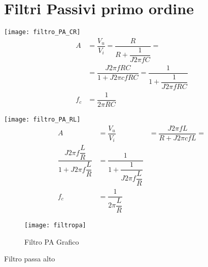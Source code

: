 \chapter{Filtri Passivi primo ordine}
\label{cha:Filtripassiviprimoord}
\minitoc
\mtcskip                                %
\minilof                                %
\mtcskip                                %
\minilot
\begin{table}
\centering
     \begin{minipage}{0.4\textwidth}
      \centering
       \texttt{[image: filtro\_PA\_CR]}
\centering
 \begin{align*}
A&=\dfrac{V_{u}}{V_{i}}
=\dfrac{R}{R+\dfrac{1}{J2\pi fC}}=\\
&=\dfrac{J2\pi fRC}{1+J2\pi cfRC}=
\dfrac{1}{1+\dfrac{1}{J2\pi fRC}}\\
f_{c}&=\dfrac{1}{2\pi RC}
        \end{align*}
       \end{minipage}\hfill
\begin{minipage}[t]{0.4\textwidth}
      \centering
\texttt{[image: filtro\_PA\_RL]}
\centering
     \begin{align*}
A&=\dfrac{V_{u}}{V_{i}}&=\dfrac{J2\pi fL}{R+J2\pi cfL}=\\
\dfrac{J2\pi f\dfrac{L}{R}}{1+J2\pi f\dfrac{L}{R}}
&=\dfrac{1}{1+\dfrac{1}{J2\pi f\dfrac{L}{R}}}\\
f_{c}&=\dfrac{1}{2\pi \dfrac{L}{R}}
        \end{align*}
     \end{minipage}
 \begin{subfigure}[b]{.5\linewidth}
 	\centering\texttt{[image: filtropa]}
 	\caption{Filtro PA Grafico}
 \end{subfigure}
\caption{Filtro passa alto}
\label{tab:filtropassaalto}
\end{table}
